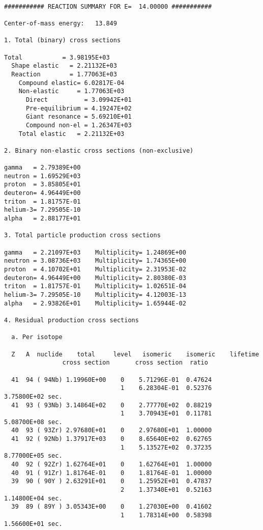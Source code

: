 \begin{samplecase}
{\small \begin{verbatim}

########### REACTION SUMMARY FOR E=  14.00000 ###########

Center-of-mass energy:   13.849

1. Total (binary) cross sections

Total           = 3.98195E+03
  Shape elastic   = 2.21132E+03
  Reaction        = 1.77063E+03
    Compound elastic= 6.02817E-04
    Non-elastic     = 1.77063E+03
      Direct          = 3.09942E+01
      Pre-equilibrium = 4.19247E+02
      Giant resonance = 5.69210E+01
      Compound non-el = 1.26347E+03
    Total elastic   = 2.21132E+03

2. Binary non-elastic cross sections (non-exclusive)

gamma   = 2.79389E+00
neutron = 1.69529E+03
proton  = 3.85805E+01
deuteron= 4.96449E+00
triton  = 1.81757E-01
helium-3= 7.29505E-10
alpha   = 2.88177E+01

3. Total particle production cross sections

gamma   = 2.21097E+03    Multiplicity= 1.24869E+00
neutron = 3.08736E+03    Multiplicity= 1.74365E+00
proton  = 4.10702E+01    Multiplicity= 2.31953E-02
deuteron= 4.96449E+00    Multiplicity= 2.80380E-03
triton  = 1.81757E-01    Multiplicity= 1.02651E-04
helium-3= 7.29505E-10    Multiplicity= 4.12003E-13
alpha   = 2.93826E+01    Multiplicity= 1.65944E-02

4. Residual production cross sections

  a. Per isotope

  Z   A  nuclide    total     level   isomeric    isomeric    lifetime
                cross section       cross section  ratio

  41  94 ( 94Nb) 1.19960E+00    0    5.71296E-01  0.47624
                                1    6.28304E-01  0.52376   3.75800E+02 sec. 
  41  93 ( 93Nb) 3.14864E+02    0    2.77770E+02  0.88219
                                1    3.70943E+01  0.11781   5.08700E+08 sec. 
  40  93 ( 93Zr) 2.97680E+01    0    2.97680E+01  1.00000
  41  92 ( 92Nb) 1.37917E+03    0    8.65640E+02  0.62765
                                1    5.13527E+02  0.37235   8.77000E+05 sec. 
  40  92 ( 92Zr) 1.62764E+01    0    1.62764E+01  1.00000
  40  91 ( 91Zr) 1.81764E-01    0    1.81764E-01  1.00000
  39  90 ( 90Y ) 2.63291E+01    0    1.25952E+01  0.47837
                                2    1.37340E+01  0.52163   1.14800E+04 sec. 
  39  89 ( 89Y ) 3.05343E+00    0    1.27030E+00  0.41602
                                1    1.78314E+00  0.58398   1.56600E+01 sec. 


\end{verbatim}}
\end{samplecase}
